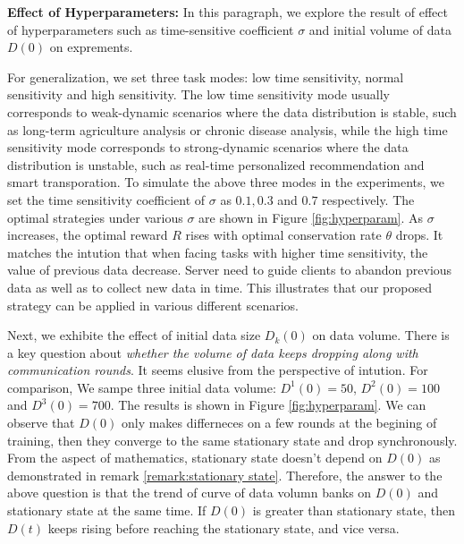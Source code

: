 \documentclass{article}
\theoremstyle{plain}
\theoremstyle{definition}
\theoremstyle{remark}
\begin{document}

\textbf{Effect of Hyperparameters: }
In this paragraph, we explore the result of effect of hyperparameters such as time-sensitive coefficient $\sigma$ and initial volume of data $D(0)$ on exprements.

For generalization, we set three task modes: low time sensitivity, normal sensitivity and high sensitivity.
The low time sensitivity mode usually corresponds to weak-dynamic scenarios where the data distribution is stable, such as long-term agriculture analysis or chronic disease analysis, while the high time sensitivity mode corresponds to strong-dynamic scenarios where the data distribution is unstable, such as real-time personalized recommendation and smart transporation.  
To simulate the above three modes in the experiments, we set the time sensitivity coefficient of $\sigma$ as $0.1, 0.3$ and $0.7$ respectively.
The optimal strategies under various $\sigma$ are shown in Figure \ref{fig:hyperparam}. As $\sigma$ increases, the optimal reward $R$ rises with optimal conservation rate $\theta$ drops.
It matches the intution that when facing tasks with higher time sensitivity, the value of previous data decrease. Server need to guide clients to abandon previous data as well as to collect new data in time.
This illustrates that our proposed strategy can be applied in various different scenarios.

Next, we exhibite the effect of initial data size $D_k(0)$ on data volume.
There is a key question about \textit{whether the volume of data keeps dropping along with communication rounds}. It seems elusive from the perspective of intution.
For comparison, We sampe three initial data volume: $D^1(0)=50$, $D^2(0)=100$ and $D^3(0)=700$. 
The results is shown in Figure \ref{fig:hyperparam}. We can observe that $D(0)$ only makes differneces on a few rounds at the begining of training, then they converge to the same stationary state and drop synchronously.
From the aspect of mathematics, stationary state doesn't depend on $D(0)$ as demonstrated in remark \ref{remark:stationary state}. 
Therefore, the answer to the above question is that the trend of curve of data volumn banks on $D(0)$ and stationary state at the same time.
If $D(0)$ is greater than stationary state, then $D(t)$ keeps rising before reaching the stationary state, and vice versa.
\end{document}
